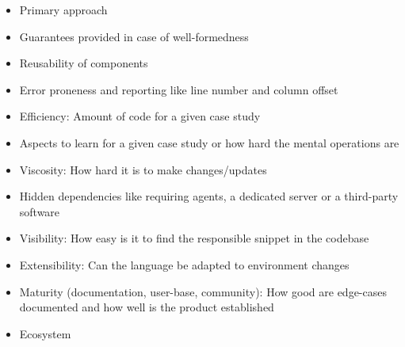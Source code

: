 \begin{itemize}
  \item Primary approach \cite{comparative_study_of_dsl_tools}
  \item Guarantees provided in case of well-formedness \cite{comparative_study_of_dsl_tools} %
  \item Reusability of components \cite{comparative_study_of_dsl_tools}
  \item Error proneness and reporting like line number and column offset \cite{comparative_study_of_dsl_tools} \cite{comparing_gpl_dsl}
  \item Efficiency: Amount of code for a given case study \cite{comparative_study_of_dsl_tools}
  \item Aspects to learn for a given case study or how hard the mental operations are \cite{comparative_study_of_dsl_tools} %
  \item Viscosity: How hard it is to make changes/updates \cite{comparing_gpl_dsl}
  \item Hidden dependencies like requiring agents, a dedicated server or a third-party software \cite{comparing_gpl_dsl}
  \item Visibility: How easy is it to find the responsible snippet in the codebase \cite{comparing_gpl_dsl}
  \item Extensibility: Can the language be adapted to environment changes
  \item Maturity (documentation, user-base, community): How good are edge-cases documented and how well is the product established
  \item Ecosystem
\end{itemize}

